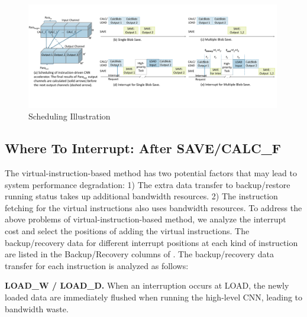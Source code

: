 






\begin{figure}[t]
    \centering
    \setlength{\abovecaptionskip}{0cm} 
	\includegraphics[width=0.99\textwidth]{fig/singlesave.pdf} 	
    \caption{
		Scheduling Illustration
    }
	\label{fig:singlesave}
\end{figure}



\subsection{ Where To Interrupt: After SAVE/CALC\_F }
\label{sec:whereinter}
The virtual-instruction-based method has two potential factors that may lead to system performance degradation: 1) The extra data transfer to backup/restore running status takes up additional bandwidth resources. 2) The instruction fetching for the virtual instructions also uses bandwidth resources.
To address the above problems of virtual-instruction-based method, we analyze the interrupt cost and select the positions of adding the virtual instructions.
The backup/recovery data for different interrupt positions at each kind of instruction are listed in the Backup/Recovery columns of . The backup/recovery data transfer for each instruction is analyzed as follows:

\textbf{LOAD\_W / LOAD\_D. }
When an interruption occurs at LOAD, the newly loaded data are immediately flushed when running the high-level CNN, leading to bandwidth waste.

